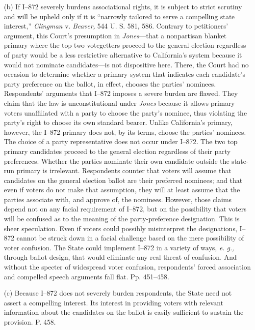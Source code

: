   (b) If I--872 severely burdens associational rights, it is subject to
strict scrutiny and will be upheld only if it is ``narrowly tailored to
serve a compelling state interest,'' \emph{Clingman} v. \emph{Beaver,} 544
U. S. 581, 586. Contrary to petitioners' argument, this Court's
presumption in \emph{Jones}---that a nonpartisan blanket primary where
the top two votegetters proceed to the general election regardless of
party would be a less restric\newpage  tive alternative to California's
system because it would not nominate candidates---is not dispositive
here. There, the Court had no occasion to determine whether a primary
system that indicates each candidate's party preference on the
ballot, in effect, chooses the parties' nominees. Respondents'
arguments that I--872 imposes a severe burden are flawed. They claim
that the law is unconstitutional under \emph{Jones} because it allows
primary voters unaffiliated with a party to choose the party's
nominee, thus violating the party's right to choose its own standard
bearer. Unlike California's primary, however, the I--872 primary
does not, by its terms, choose the parties' nominees. The choice
of a party representative does not occur under I--872. The two top
primary candidates proceed to the general election regardless of their
party preferences. Whether the parties nominate their own candidate
outside the state-run primary is irrelevant. Respondents counter that
voters will assume that candidates on the general election ballot are
their preferred nominees; and that even if voters do not make that
assumption, they will at least assume that the parties associate with,
and approve of, the nominees. However, those claims depend not on any
facial requirement of I--872, but on the possibility that voters will
be confused as to the meaning of the party-preference designation. This
is sheer speculation. Even if voters could possibly misinterpret the
designations, I--872 cannot be struck down in a facial challenge based
on the mere possibility of voter confusion. The State could implement
I--872 in a variety of ways, \emph{e. g.,} through ballot design, that
would eliminate any real threat of confusion. And without the specter
of widespread voter confusion, respondents' forced association and
compelled speech arguments fall flat. Pp. 451--458.

  (c) Because I--872 does not severely burden respondents, the State
need not assert a compelling interest. Its interest in providing voters
with relevant information about the candidates on the ballot is easily
sufficient to sustain the provision. P. 458.

